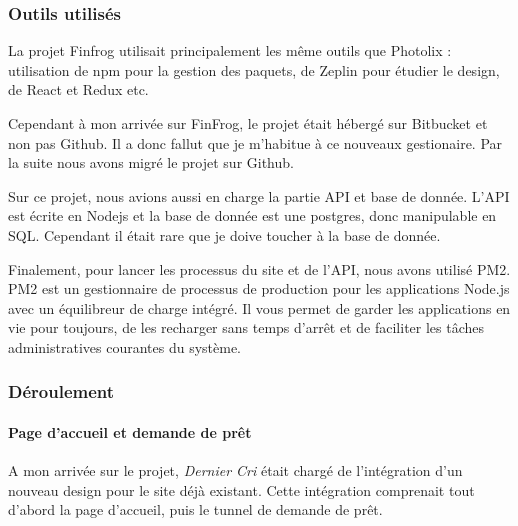 \documentclass[12pt,a4paper]{article}
\begin{document}
  \subsubsection{Outils utilisés}\label{outils-utilisuxe9s-1}

  \bigskip

  La projet Finfrog utilisait principalement les même outils que Photolix
  : utilisation de npm pour la gestion des paquets, de Zeplin pour étudier
  le design, de React et Redux etc.

  \bigskip

  Cependant à mon arrivée sur FinFrog, le projet était hébergé sur
  Bitbucket et non pas Github. Il a donc fallut que je m'habitue à ce
  nouveaux gestionaire. Par la suite nous avons migré le projet sur
  Github.

  \bigskip

  Sur ce projet, nous avions aussi en charge la partie API et base de
  donnée. L'API est écrite en Nodejs et la base de donnée est une
  postgres, donc manipulable en SQL. Cependant il était rare que je doive
  toucher à la base de donnée.

  \bigskip

  Finalement, pour lancer les processus du site et de l'API, nous avons
  utilisé PM2. PM2 est un gestionnaire de processus de production pour les
  applications Node.js avec un équilibreur de charge intégré. Il vous
  permet de garder les applications en vie pour toujours, de les recharger
  sans temps d'arrêt et de faciliter les tâches administratives courantes
  du système.

  \bigskip

  \subsubsection{Déroulement}\label{duxe9roulement-1}

  \paragraph{Page d'accueil et demande de
  prêt}\label{page-daccueil-et-demande-de-pruxeat}

  \bigskip

  A mon arrivée sur le projet, \emph{Dernier Cri} était chargé de
  l'intégration d'un nouveau design pour le site déjà existant. Cette
  intégration comprenait tout d'abord la page d'accueil, puis le tunnel de
  demande de prêt.

  \bigskip
\end{document}
